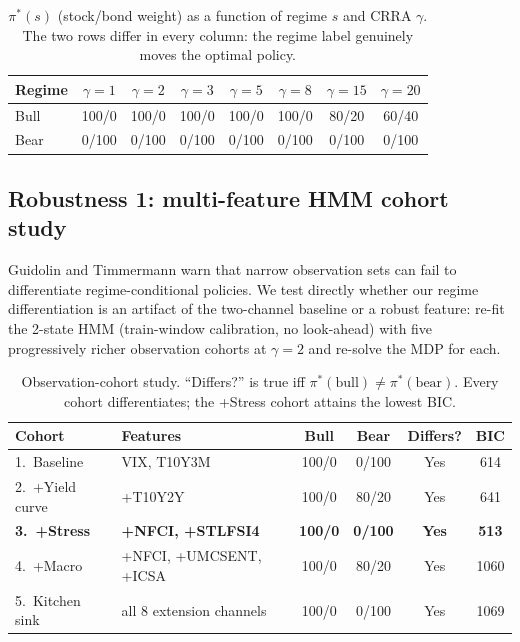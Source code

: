 \documentclass[11pt]{article}
\theoremstyle{plain1}
\theoremstyle{definition1}
\newcommand{\1}{\mathbf{1}}
\begin{document}
\begin{table}[H]\centering\small\setlength{\tabcolsep}{6pt}\renewcommand{\arraystretch}{1.0}
\caption{$\pi^\ast(s)$ (stock/bond weight) as a function of regime $s$ and CRRA $\gamma$. The two rows differ in every column: the regime label genuinely moves the optimal policy.}\label{tab:gamma-policy}
\begin{tabular}{lccccccc}
\toprule
Regime & $\gamma{=}1$ & $\gamma{=}2$ & $\gamma{=}3$ & $\gamma{=}5$ & $\gamma{=}8$ & $\gamma{=}15$ & $\gamma{=}20$ \\
\midrule
Bull & 100/0 & 100/0 & 100/0 & 100/0 & 100/0 & 80/20 & 60/40 \\
Bear & 0/100 & 0/100 & 0/100 & 0/100 & 0/100 & 0/100 & 0/100 \\
\bottomrule
\end{tabular}
\end{table}

\subsection{Robustness 1: multi-feature HMM cohort study}\label{sec:multifeature}

Guidolin and Timmermann \cite{guidolin2007} warn that narrow observation sets can fail to differentiate regime-conditional policies. We test directly whether our regime differentiation is an artifact of the two-channel baseline or a robust feature: re-fit the 2-state HMM (train-window calibration, no look-ahead) with five progressively richer observation cohorts at $\gamma{=}2$ and re-solve the MDP for each.

\begin{table}[H]\centering\small\setlength{\tabcolsep}{5pt}\renewcommand{\arraystretch}{1.0}
\caption{Observation-cohort study. ``Differs?'' is true iff $\pi^\ast(\text{bull})\neq\pi^\ast(\text{bear})$. Every cohort differentiates; the +Stress cohort attains the lowest BIC.}\label{tab:cohort}
\begin{tabular}{l l ccc c}
\toprule
\textbf{Cohort} & \textbf{Features} & \textbf{Bull} & \textbf{Bear} & \textbf{Differs?} & \textbf{BIC} \\
\midrule
1.\ Baseline    & VIX, T10Y3M & 100/0 & 0/100 & Yes & 614 \\
2.\ +Yield curve & +T10Y2Y     & 100/0 & 80/20 & Yes & 641 \\
\textbf{3.\ +Stress} & \textbf{+NFCI, +STLFSI4} & \textbf{100/0} & \textbf{0/100} & \textbf{Yes} & \textbf{513} \\
4.\ +Macro      & +NFCI, +UMCSENT, +ICSA & 100/0 & 80/20 & Yes & 1060 \\
5.\ Kitchen sink & all 8 extension channels & 100/0 & 0/100 & Yes & 1069 \\
\bottomrule
\end{tabular}
\end{table}
\end{document}

